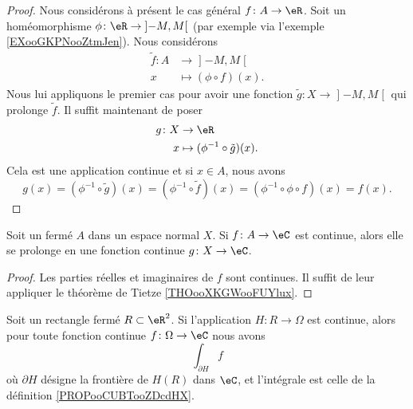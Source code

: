 \begin{proof}
    Nous considérons à présent le cas général \( f\colon A\to \eR\). Soit un homéomorphisme \( \phi\colon \eR\to \mathopen] -M , M \mathclose[\) (par exemple via l'exemple \ref{EXooGKPNooZtmJen}). Nous considérons
    \begin{equation}
        \begin{aligned}
        \tilde f\colon A&\to \mathopen] -M , M \mathclose[ \\
            x&\mapsto (\phi\circ f)(x). 
        \end{aligned}
    \end{equation}
    Nous lui appliquons le premier cas pour avoir une fonction \( \tilde g\colon X\to \mathopen] -M , M \mathclose[\) qui prolonge \( \tilde f\). Il suffit maintenant de poser
    \begin{equation}
        \begin{aligned}
            g\colon X&\to \eR \\
            x&\mapsto (\phi^{-1}\circ\tilde g)(x). 
        \end{aligned}
    \end{equation}
    Cela est une application continue et si \( x\in A\), nous avons
    \begin{equation}
        g(x)=(\phi^{-1}\circ \tilde g)(x)=(\phi^{-1}\circ \tilde f)(x)=(\phi^{-1}\circ\phi\circ f)(x)=f(x).
    \end{equation}
\end{proof}

\begin{corollary}
    Soit un fermé \( A\) dans un espace normal \( X\). Si \( f\colon A\to \eC\) est continue, alors elle se prolonge en une fonction continue \( g\colon X\to \eC\).
\end{corollary}

\begin{proof}
    Les parties réelles et imaginaires de \( f\) sont continues. Il suffit de leur appliquer le théorème de Tietze \ref{THOooXKGWooFUYlux}.
\end{proof}

\begin{lemma}       \label{LEMooOFCEooIsuchR}
    Soit un rectangle fermé \( R\subset \eR^2\). Si l'application \( H\colon R\to \Omega\) est continue, alors pour toute fonction continue \( f\colon \Omega\to \eC\) nous avons
    \begin{equation}
        \int_{\partial H}f
    \end{equation}
    où \( \partial H\) désigne la frontière de \( H(R)\) dans \( \eC\), et l'intégrale est celle de la définition \ref{PROPooCUBTooZDcdHX}.
\end{lemma}

